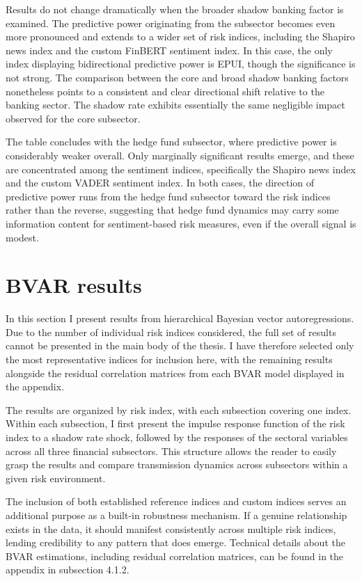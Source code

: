 \documentclass[12pt,a4paper]{report}\usepackage[a4paper, top=2.5cm, bottom=2.5cm, left=2.5cm, right=2.5cm]{geometry}
\begin{document}
Results do not change dramatically when the broader shadow banking factor is examined. The predictive power originating from the subsector becomes even more pronounced and extends to a wider set of risk indices, including the Shapiro news index and the custom FinBERT sentiment index. In this case, the only index displaying bidirectional predictive power is EPUI, though the significance is not strong. The comparison between the core and broad shadow banking factors nonetheless points to a consistent and clear directional shift relative to the banking sector. The shadow rate exhibits essentially the same negligible impact observed for the core subsector.

The table concludes with the hedge fund subsector, where predictive power is considerably weaker overall. Only marginally significant results emerge, and these are concentrated among the sentiment indices, specifically the Shapiro news index and the custom VADER sentiment index. In both cases, the direction of predictive power runs from the hedge fund subsector toward the risk indices rather than the reverse, suggesting that hedge fund dynamics may carry some information content for sentiment-based risk measures, even if the overall signal is modest.

\section{BVAR results}

In this section I present results from hierarchical Bayesian vector autoregressions. Due to the number of individual risk indices considered, the full set of results cannot be presented in the main body of the thesis. I have therefore selected only the most representative indices for inclusion here, with the remaining results alongside the residual correlation matrices from each BVAR model displayed in the appendix.

The results are organized by risk index, with each subsection covering one index. Within each subsection, I first present the impulse response function of the risk index to a shadow rate shock, followed by the responses of the sectoral variables across all three financial subsectors. This structure allows the reader to easily grasp the results and compare transmission dynamics across subsectors within a given risk environment.

The inclusion of both established reference indices and custom indices serves an additional purpose as a built-in robustness mechanism. If a genuine relationship exists in the data, it should manifest consistently across multiple risk indices, lending credibility to any pattern that does emerge. Technical details about the BVAR estimations, including residual correlation matrices, can be found in the appendix in subsection 4.1.2. 
\end{document}

